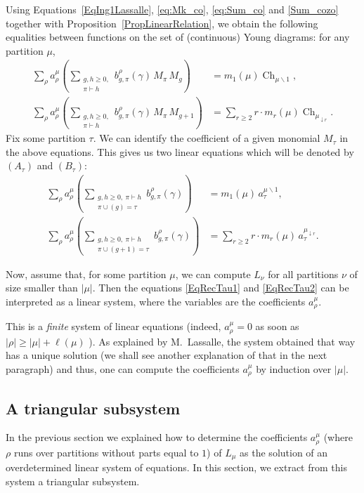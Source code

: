 \documentclass[11pt]{amsart}
\theoremstyle{plain}
\theoremstyle{remark}
\DeclareMathOperator{\Ch}{Ch}
\begin{document}
Using Equations~\eqref{EqIng1Lassalle}, \eqref{eq:Mk_co}, \eqref{eq:Sum_co} and \eqref{Sum_cozo}
together with Proposition~\ref{PropLinearRelation}, we obtain the following equalities 
between functions on the set of (continuous) Young diagrams: for any partition $\mu$,
\begin{align}
    \sum_\rho a^\mu_\rho \left( \sum_{\substack{g,h \geq 0, \\ \pi \vdash h}} b_{g,\pi}^\rho(\gamma) 
    \, M_\pi \, M_g  \right) &= m_1(\mu) \Ch_{\mu \backslash 1},
    \tag{A}\label{EqRec1}\\
    \sum_\rho a^\mu_\rho \left( \sum_{\substack{g,h \geq 0, \\ \pi \vdash h}} b_{g,\pi}^\rho(\gamma) 
    \, M_{\pi} \, M_{g+1}  \right) &= \sum_{r \geq 2} r \cdot m_r(\mu) \Ch_{\mu_{\downarrow r}}.
    \tag{B}\label{EqRec2}
\end{align}
Fix some partition $\tau$.
We can identify the coefficient of a given monomial $M_\tau$ in the above equations.
This gives us two linear equations which will be denoted by $(A_\tau)$ and $(B_\tau)$:
\begin{align}
    \sum_\rho a^\mu_\rho \left( \sum_{\substack{g,h \geq 0, \ \pi \vdash h \\ \pi \cup (g)=\tau}} b_{g,\pi}^\rho(\gamma) 
     \right) &= m_1(\mu) \, a^{\mu \backslash 1}_\tau,
    \tag{$A_\tau$}\label{EqRecTau1}\\
    \sum_\rho a^\mu_\rho \left( \sum_{\substack{g,h \geq 0, \ \pi \vdash h \\ \pi \cup (g+1)=\tau}} b_{g,\pi}^\rho(\gamma) 
    \right) &= \sum_{r \geq 2} r \cdot m_r(\mu) \, a^{\mu_{\downarrow r}}_\tau.
    \tag{$B_\tau$}\label{EqRecTau2}
\end{align}

Now, assume that, for some partition $\mu$, we can compute $L_\nu$ for all partitions $\nu$ of size smaller than $|\mu|$.
Then the equations \eqref{EqRecTau1} and \eqref{EqRecTau2} can be interpreted as a linear system,
where the variables are the coefficients $a^\mu_\rho$.

This is a {\em finite} system of linear equations (indeed, $a^\mu_\rho=0$
as soon as $|\rho| \geq |\mu|+\ell(\mu)$ \cite[Proposition 9.2 (ii)]{Lassalle2009}).
As explained by M.~Lassalle, the system obtained that way has a unique solution
(we shall see another explanation of that in the next paragraph) and
thus, one can compute the coefficients $a^\mu_\rho$ by induction over $|\mu|$.

\subsection{A triangular subsystem}
In the previous section we explained how to determine the coefficients $a^\mu_\rho$
(where $\rho$ runs over partitions without parts equal to $1$) of $L_\mu$ as the solution
of an overdetermined linear system of equations.
In this section, we extract from this system a triangular subsystem.
\end{document}
